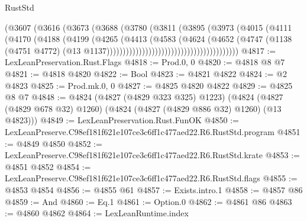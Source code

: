 \begin{lexlean}{RustStd}
\begin{coremodule}
                                            (@3607
                                              (@3616
                                                (@3673
                                                  (@3688
                                                    (@3780
                                                      (@3811
                                                        (@3895
                                                          (@3973
                                                            (@4015
                                                              (@4111
                                                                (@4170
                                                                  (@4188
                                                                    (@4199
                                                                      (@4265
                                                                        (@4413
                                                                          (@4583
                                                                            (@4624
                                                                              (@4652
                                                                                (@4747
                                                                                  (@1138
                                                                                    (@4751 @4772)
                                                                                    (@13
                                                                                      @1137)))))))))))))))))))))))))))))))))))))))))
@4817 := LexLeanPreservation.Rust.Flags
@4818 := Prod.{0, 0}
@4820 := @4818 @8 @7
@4821 := @4818 @4820
@4822 := Bool
@4823 := @4821 @4822
@4824 := @2 @4823
@4825 := Prod.mk.{0, 0}
@4827 := @4825 @4820 @4822
@4829 := @4825 @8 @7
@4848 := @4824
    (@4827 (@4829 @323 @325) @1223)
    (@4824 (@4827 (@4829 @678 @32) @1260) (@4824 (@4827 (@4829 @886 @32) @1260) (@13 @4823)))
@4849 := LexLeanPreservation.Rust.FunOK
@4850 := LexLeanPreserve.C98ef181f621e107ce3c6ff1c477aed22.R6.RustStd.program
@4851 := @4849 @4850
@4852 := LexLeanPreserve.C98ef181f621e107ce3c6ff1c477aed22.R6.RustStd.krate
@4853 := @4851 @4852
@4854 := LexLeanPreserve.C98ef181f621e107ce3c6ff1c477aed22.R6.RustStd.flags
@4855 := @4853 @4854
@4856 := @4855 @61
@4857 := Exists.intro.{1}
@4858 := @4857 @86
@4859 := And
@4860 := Eq.{1}
@4861 := Option.{0}
@4862 := @4861 @86
@4863 := @4860 @4862
@4864 := LexLeanRuntime.index

\end{coremodule}
\end{lexlean}
